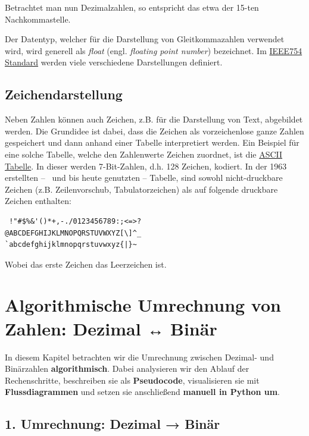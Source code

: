 \documentclass[
  letterpaper,
  DIV=11,
  numbers=noendperiod]{scrreprt}
\begin{document}
Betrachtet man nun Dezimalzahlen, so entspricht das etwa der 15-ten
Nachkommastelle.

Der Datentyp, welcher für die Darstellung von Gleitkommazahlen verwendet
wird, wird generell als \emph{float} (engl. \emph{floating point
number}) bezeichnet. Im
\href{https://de.wikipedia.org/wiki/IEEE_754}{IEEE754 Standard} werden
viele verschiedene Darstellungen definiert.

\section{Zeichendarstellung}\label{zeichendarstellung}

Neben Zahlen können auch Zeichen, z.B. für die Darstellung von Text,
abgebildet werden. Die Grundidee ist dabei, dass die Zeichen als
vorzeichenlose ganze Zahlen gespeichert und dann anhand einer Tabelle
interpretiert werden. Ein Beispiel für eine solche Tabelle, welche den
Zahlenwerte Zeichen zuordnet, ist die
\href{https://de.wikipedia.org/wiki/American_Standard_Code_for_Information_Interchange}{ASCII
Tabelle}. In dieser werden 7-Bit-Zahlen, d.h. 128 Zeichen, kodiert. In
der 1963 erstellten --~ und bis heute genutzten -- Tabelle, sind sowohl
nicht-druckbare Zeichen (z.B. Zeilenvorschub, Tabulatorzeichen) als auf
folgende druckbare Zeichen enthalten:

\begin{verbatim}
 !"#$%&'()*+,-./0123456789:;<=>?
@ABCDEFGHIJKLMNOPQRSTUVWXYZ[\]^_
`abcdefghijklmnopqrstuvwxyz{|}~
\end{verbatim}

Wobei das erste Zeichen das Leerzeichen ist.

\chapter{Algorithmische Umrechnung von Zahlen: Dezimal ↔
Binär}\label{algorithmische-umrechnung-von-zahlen-dezimal-binuxe4r}

In diesem Kapitel betrachten wir die Umrechnung zwischen Dezimal- und
Binärzahlen \textbf{algorithmisch}. Dabei analysieren wir den Ablauf der
Rechenschritte, beschreiben sie als \textbf{Pseudocode}, visualisieren
sie mit \textbf{Flussdiagrammen} und setzen sie anschließend
\textbf{manuell in Python um}.

\section{1. Umrechnung: Dezimal →
Binär}\label{umrechnung-dezimal-binuxe4r}
\end{document}
